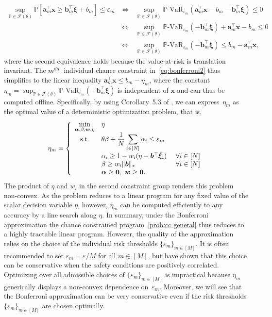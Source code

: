 \documentclass[nonblindrev]{informs2017}
\newcommand{\bmt}[1]{\tilde{\bm{#1}}}
\newcommand{\bmh}[1]{\hat{\bm{#1}}}
\newcommand{\1}[1]{\mathds{1}{\left(#1\right)}}
\begin{document}
\begin{eqnarray*}
	\sup_{\mathbb{P} \in \mathcal{F}(\theta)} \mathbb{P}[\bm{a}^\top_m \bm{x} \ge \bm{b}^\top_m \bmt{\xi} + b_m] \leq \varepsilon_m 
	~&\iff &~ \sup_{\mathbb{P} \in \mathcal{F}(\theta)} \mathbb{P}\text{-VaR}_{\varepsilon_m}(\bm{a}^\top_m\bm{x} - b_m - \bm{b}^\top_m\bm{\xi}) \leq 0 \\
	~&\iff &~ \sup_{\mathbb{P} \in \mathcal{F}(\theta)} \mathbb{P}\text{-VaR}_{\varepsilon_m}(- \bm{b}^\top_m\bm{\xi}) + \bm{a}^\top_m\bm{x} - b_m  \leq 0 \\
	~&\iff &~ \sup_{\mathbb{P} \in \mathcal{F}(\theta)} \mathbb{P}\text{-VaR}_{\varepsilon_m}(- \bm{b}^\top_m\bm{\xi}) \leq b_m - \bm{a}^\top_m\bm{x},
\end{eqnarray*}
where the second equivalence holds because the value-at-risk is translation invariant. The $m^{\rm th}$~individual chance constraint in~\eqref{eq:bonferroni2} thus simplifies to the linear inequality $\bm{a}^\top_m\bm{x} \leq b_m - \eta_m$, where the constant $\eta_m= \sup_{\mathbb{P} \in \mathcal{F}(\theta)} \mathbb{P}\text{-VaR}_{\varepsilon_m}(- \bm{b}^\top_m\bm{\xi})$
is independent of $\bm{x}$ and can thus be computed offline. Specifically, by using Corollary~5.3 of \citet{Esfahani_Kuhn_2017}, we can express~$\eta_m$ as the optimal value of a deterministic optimization problem, that is,
$$
\eta_m=\left\{ \begin{array}{cll}
\displaystyle \min_{\bm{\alpha}, \beta, \bm{w}, \eta} & \eta \\
{\rm s.t.} & \theta\beta + \dfrac{1}{N} \displaystyle \sum_{i \in [N]} \alpha_i  \leq \varepsilon_m \\
& \alpha_i \geq 1 - w_i(\eta - \bm{b}^\top\bmh{\xi}_i)  &~\forall i \in [N] \\
& \beta \ge w_i \|\bm{b}\|_* &~\forall i \in [N] \\
& \bm \alpha\ge \bm 0,~\bm{w} \geq \bm{0}. 
\end{array}\right.
$$
The product of $\eta$ and $w_i$ in the second constraint group renders this problem non-convex. As the problem reduces to a linear program for any fixed value of the scalar decision variable $\eta$, however, $\eta_m$ can be computed efficiently to any accuracy by a line search along $\eta$. In summary, under the Bonferroni approximation the chance constrained program~\eqref{prob:cc general} thus reduces to a highly tractable linear program. However, the quality of the approximation relies on the choice of the individual risk thresholds $\{\varepsilon_m\}_{m \in [M]}$. It is often recommended to set $\varepsilon_m = \varepsilon/M$ for all $m \in [M]$, but \cite{Chen_Sim_Sun_2007} have shown that this choice can be conservative when the safety conditions are positively correlated. Optimizing over all admissible choices of $\{\varepsilon_m\}_{m \in [M]}$ is impractical because $\eta_m$ generically displays a non-convex dependence on~$\varepsilon_m$. Moreover, we will see that the Bonferroni approximation can be very conservative even if the risk thresholds $\{\varepsilon_m\}_{m \in [M]}$ are chosen optimally.
\end{document}
